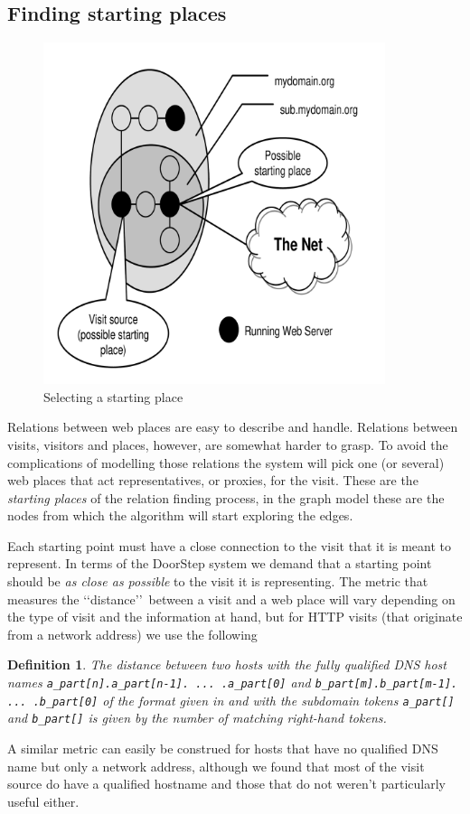 \documentclass[a4paper]{danarticle}
\newtheorem{definition}{Definition}
\theoremstyle{remark}
\begin{document}
    \subsection{Finding starting places}
       \begin{figure}[ht]
       \centering
	 \includegraphics[width=10cm]{startingplace}
	 \caption{Selecting a starting place}
	 \label{startingplace}
       \end{figure}
       Relations between web places are easy to describe and handle. Relations
       between visits, visitors and places, however, are somewhat harder to
       grasp. To avoid the complications of modelling those relations the system
       will pick one (or several) web places that act representatives, or
       proxies, for the visit. These are the \textit{starting places} of the 
       relation finding process,
       in the graph model these are the nodes from which the algorithm will
       start exploring the edges. 
       
       Each starting point must have a close connection to the visit that it is
       meant to represent. In terms of the DoorStep system we demand that a
       starting point should be \textit{as close as possible} to the visit it is
       representing. The metric that measures the \lq\lq distance\rq\rq\ between
       a visit and a web place will vary depending on the type of visit and the
       information at hand, but for HTTP visits (that originate from a network
       address) we use the following
       \begin{definition}
       \label{metric}
       The distance between two hosts with the fully qualified DNS host names
       \verb$a_part[n].a_part[n-1]. ... .a_part[0]$ and 
       \verb$b_part[m].b_part[m-1]. ... .b_part[0]$ of the format given in
       \cite{dns} and with the subdomain tokens \verb$a_part[]$ and 
       \verb$b_part[]$ is given by the number of matching right-hand tokens.
       \end{definition}
       A similar metric can easily be construed for hosts that have no
       qualified DNS name but only a network address, although we found that
       most of the visit source do have a qualified hostname and those that do
       not weren't particularly useful either.
       
\end{document}
